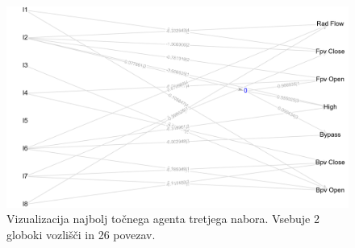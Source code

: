 
\begin{figure}[H]
    \begin{center}
        \includegraphics[width=13cm]{shuttle/3/acc_g}
    \end{center}
    \caption{Vizualizacija najbolj točnega agenta tretjega nabora. Vsebuje 2 globoki vozlišči in 26 povezav.}
    \label{fig:statlog_acc_3_g}
\end{figure}

